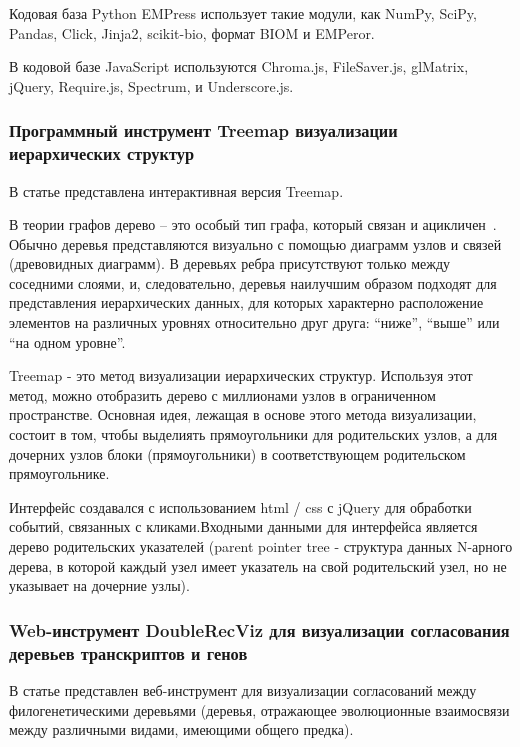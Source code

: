 Кодовая база Python EMPress использует такие модули, как NumPy, SciPy, Pandas, Click, Jinja2, scikit-bio, формат BIOM и EMPeror. 

В кодовой базе JavaScript используются Chroma.js, FileSaver.js, glMatrix, jQuery, Require.js, Spectrum, и Underscore.js. 

\subsubsection{Программный инструмент Treemap визуализации иерархических структур}

В статье \cite{Jadeja2020} представлена интерактивная версия Treemap.

В теории графов дерево -- это особый тип графа, который связан и ацикличен~\cite{ZZZ}. Обычно деревья представляются визуально с помощью диаграмм узлов и связей (древовидных диаграмм). В деревьях ребра присутствуют только между соседними слоями, и, следовательно, деревья наилучшим образом подходят для представления иерархических данных, для которых характерно расположение элементов на различных уровнях относительно друг друга: ``ниже'', ``выше'' или ``на одном уровне''.

Treemap - это метод визуализации иерархических структур. Используя этот метод, можно отобразить дерево с миллионами узлов в ограниченном пространстве. Основная идея, лежащая в основе этого метода визуализации, состоит в том, чтобы выделиять прямоугольники для родительских узлов, а для дочерних узлов блоки (прямоугольники) в соответствующем родительском прямоугольнике. 

Интерфейс создавался с использованием html / css с jQuery для обработки событий, связанных с кликами.Входными данными для интерфейса является дерево родительских указателей (parent pointer tree - структура данных N-арного дерева, в которой каждый узел имеет указатель на свой родительский узел, но не указывает на дочерние узлы). 

\subsubsection{Web-инструмент DoubleRecViz для визуализации согласования деревьев транскриптов и генов}

В статье \cite{Kuitche2021} представлен веб-инструмент для визуализации согласований между филогенетическими деревьями (деревья, отражающее эволюционные взаимосвязи между различными видами, имеющими общего предка).

